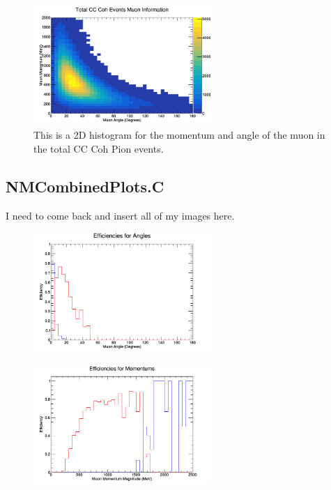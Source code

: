 \documentclass[11pt]{article}
\begin{document}
\begin{figure}[H]
\centering
\includegraphics[width=0.6\textwidth]{NewANMBergerSehgalImages/9-TotalCCCohMuonInfoANMBS.png}
\caption{This is a 2D histogram for the momentum and angle of the muon in the total CC Coh Pion events.}
\end{figure}


\subsection{NMCombinedPlots.C}
I need to come back and insert all of my images here.

\begin{figure}[H]
\centering
\includegraphics[width=0.6\textwidth]{NMCombinedPlotsImages/1-NMCombinedPlots.png}
\caption{}
\end{figure}

\begin{figure}[H]
\centering
\includegraphics[width=0.6\textwidth]{NMCombinedPlotsImages/2-NMCombinedPlots.png}
\caption{}
\end{figure}
\end{document}
